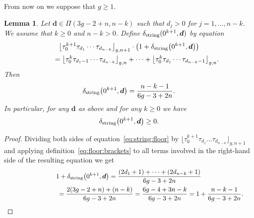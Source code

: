 \documentclass[pdftex]{sigma}
\newtheorem{Lemma}[Theorem]{Lemma}
\theoremstyle{definition}
\begin{document}
From now on we suppose that $g\ge 1$.

\begin{Lemma}\label{lm:string}
Let $\boldsymbol{d}\in\Pi(3g-2+n,n-k)$ such that
$d_j>0$ for $j=1,\dots,n-k$. We assume that $k\ge 0$ and $n-k>0$.
Define $\delta_{\rm string}(0^{k+1},\boldsymbol{d})$
by equation
\begin{gather}
\big\lfloor \tau_0^{k+1}\tau_{d_1} \cdots \tau_{d_{n-k}}\big\rfloor_{g,n+1}
\cdot\big(1+\delta_{\rm string}\big(0^{k+1},\boldsymbol{d}\big)\big)
\nonumber\\
\qquad{} =
\big\lfloor \tau_0^k\tau_{d_1-1} \cdots \tau_{d_{n-k}}\big\rfloor_{g,n}
+\dots +\big\lfloor \tau_0^k\tau_{d_1} \cdots \tau_{d_{n-k}-1}\big\rfloor_{g,n} .\label{eq:string:floor}
\end{gather}
Then
\[
\delta_{\rm string}\big(0^{k+1},\boldsymbol{d}\big)=\frac{n-k-1}{6g-3+2n} .
\]
In particular, for any $\boldsymbol{d}$ as above and for any
$k\ge 0$ we have
\begin{gather}\label{eq:delta:string:is:positive}
\delta_{\rm string}\big(0^{k+1},\boldsymbol{d}\big)\ge 0 .
\end{gather}
\end{Lemma}

\begin{proof}Dividing both sides of equation~\eqref{eq:string:floor} by
$\big\lfloor \tau_0^{k+1}\tau_{d_1} \dots \tau_{d_{n-k}}\big\rfloor_{g,n+1}$
and applying definition~\eqref{eq:floor:brackets}
to all terms involved in the right-hand side of the resulting
equation we get
\begin{gather*}
1+\delta_{\rm string}\big(0^{k+1},\boldsymbol{d}\big)
=\frac{(2d_1+1)+\dots+(2d_{n-k}+1)}{6g-3+2n}
 \\
 \hphantom{1+\delta_{\rm string}\big(0^{k+1},\boldsymbol{d}\big)}{} =
\frac{2(3g-2+n)+(n-k)}{6g-3+2n}
=\frac{6g-4+3n-k}{6g-3+2n}
=1+\frac{n-k-1}{6g-3+2n} .\!\!\!\tag*{\qed}
\end{gather*}\renewcommand{\qed}{}
\end{proof}
\end{document}
